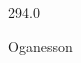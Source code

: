\documentclass[12pt]{article}
\begin{document}
\hfill{}
\vfill
\begin{center}
  {\fontsize{50}{60}
  }

  \vspace{1em}

  294.0

Oganesson
\end{center}
\vfill
\end{document}
